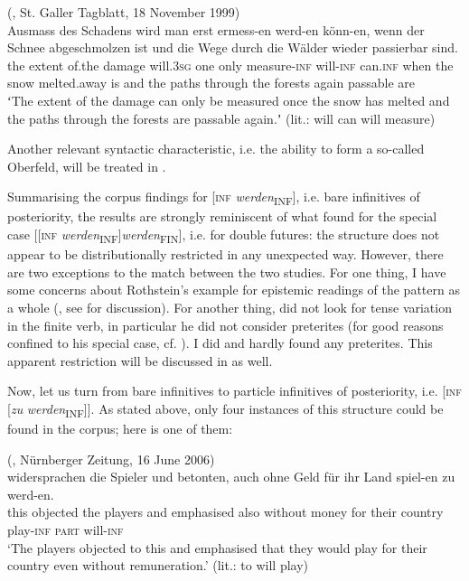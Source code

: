 \documentclass[output=paper,hidelinks]{langscibook}
\begin{document}
\begin{enumerate}[label=(\roman*)]
\ea\label{ex:reiner:30} 	 (, St. Galler Tagblatt, 18 November 1999) \\
	{Ausmass}	{des}		{Schadens}	{wird}   {man}	{erst}	{ermess-en}		{werd-en}	{könn-en,}    {wenn}	{der}	{Schnee}	{abgeschmolzen}	{ist} {und}	{die}	{Wege}		{durch}		{die}	{Wälder}  {wieder}	{passierbar}	{sind.}\\
the	extent		of.the		damage	will.\textsc{3sg}    one	only	measure-\textsc{inf}		will-\textsc{inf}	can.\textsc{inf} when	the	snow		melted.away		is  and	the	paths		through	the	forests again	passable	are \\
\glt ʻThe extent of the damage can only be measured once the snow has melted and the paths through the forests are passable again.ʼ (lit.: will can will measure)
\z 

Another relevant syntactic characteristic, i.e. the ability to form a so-called Oberfeld, will be treated in .
\end{enumerate}

Summarising the corpus findings for [\textsc{inf} \textit{werden}\textsubscript{INF}], i.e. bare infinitives of posteriority, the results are strongly reminiscent of what \citet{Rothstein2013a} found for the special case [[\textsc{inf} \textit{werden}\textsubscript{INF}]\textit{werden}\textsubscript{FIN}], i.e. for double futures: the structure does not appear to be distributionally restricted in any unexpected way. However, there are two exceptions to the match between the two studies. For one thing, I have some concerns about Rothstein’s example for epistemic readings of the pattern as a whole (\citealt[115]{Rothstein2013a}, see  for discussion). For another thing, \citet[103–104]{Rothstein2013a} did not look for tense variation in the finite verb, in particular he did not consider preterites (for good reasons confined to his special case, cf. \citealt[107]{Bogner2009}). I did and hardly found any preterites. This apparent restriction will be discussed in  as well.

Now, let us turn from bare infinitives to particle infinitives of posteriority, i.e. [\textsc{inf} [\emph{zu} \textit{werden}\textsubscript{INF}]]. As stated above, only four instances of this structure could be found in the corpus; here is one of them:

\ea\label{ex:reiner:31} 	 (, Nürnberger Zeitung, 16 June 2006) \\
	{widersprachen}	{die}	{Spieler}	{und} {betonten,}	{auch}	{ohne}		{Geld}		{für} {ihr}	{Land}		{spiel-en}	{zu}	{werd-en.}\\
this	objected		the	players	and emphasised	also	without	money	for their	country	play-\textsc{inf}	\textsc{part}	will-\textsc{inf}\\
\glt ‘The players objected to this and emphasised that they would play for their country even without remuneration.’ (lit.: to will play)
\z 
\end{document}
